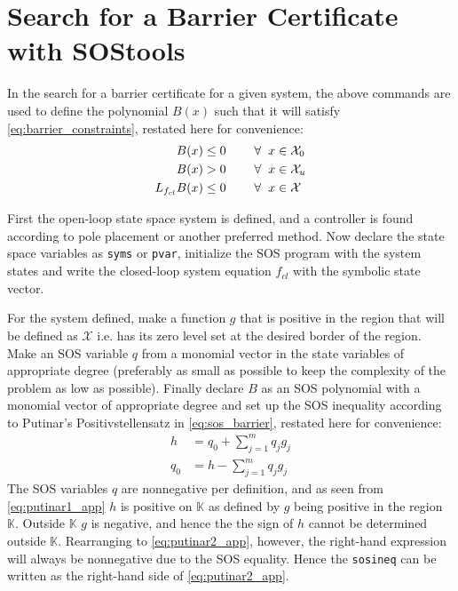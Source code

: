 \section{Search for a Barrier Certificate with SOStools}
In the search for a barrier certificate for a given system, the above commands are used to define the polynomial $B(x)$ such that it will satisfy \autoref{eq:barrier_constraints}, restated here for convenience:
\begin{subequations}\label{eq:barrier_constraints_app}
	\begin{flalign}
		B(x) &\leq 0 \hspace{0.8cm}  \forall \hspace{2mm} x \in \mathcal{X}_0  \label{cer1_app}\\
		B(x) &> 0  \hspace{0.8cm}  \forall \hspace{2mm} x \in \mathcal{X}_u \label{cer2_app} \\
		L_{f_{cl}}B(x) &\leq 0 \hspace{0.8cm}  \forall \hspace{2mm} x \in \mathcal{X} \label{cer3_app}
	\end{flalign}
\end{subequations}

First the open-loop state space system is defined, and a controller is found according to pole placement or another preferred method. Now declare the state space variables as \verb|syms| or \verb|pvar|, initialize the SOS program with the system states and write the closed-loop system equation $f_{cl}$ with the symbolic state vector.

For the system defined, make a function $g$ that is positive in the region that will be defined as $\mathcal{X}$ i.e. has its zero level set at the desired border of the region. Make an SOS variable $q$ from a monomial vector in the state variables of appropriate degree (preferably as small as possible to keep the complexity of the problem as low as possible). Finally declare $B$ as an SOS polynomial with a monomial vector of appropriate degree and set up the SOS inequality according to Putinar's Positivstellensatz in \autoref{eq:sos_barrier}, restated here for convenience:
\begin{subequations}\label{eq:sos_barrier_app}
\begin{align}
h &= q_0+\sum _{j=1}^{m}q_jg_j \label{eq:putinar1_app} \\
q_0 &= h - \sum _{j=1}^{m}q_jg_j \label{eq:putinar2_app}
\end{align}
\end{subequations} 	
The SOS variables $q$ are nonnegative per definition, and as seen from \autoref{eq:putinar1_app} $h$ is positive on $\mathbb{K}$ as defined by $g$ being positive in the region $\mathbb{K}$. Outside $\mathbb{K}$ $g$ is negative, and hence the the sign of $h$ cannot be determined outside $\mathbb{K}$. Rearranging to \autoref{eq:putinar2_app}, however, the right-hand expression will always be nonnegative due to the SOS equality. Hence the \verb|sosineq| can be written as the right-hand side of \autoref{eq:putinar2_app}. 

